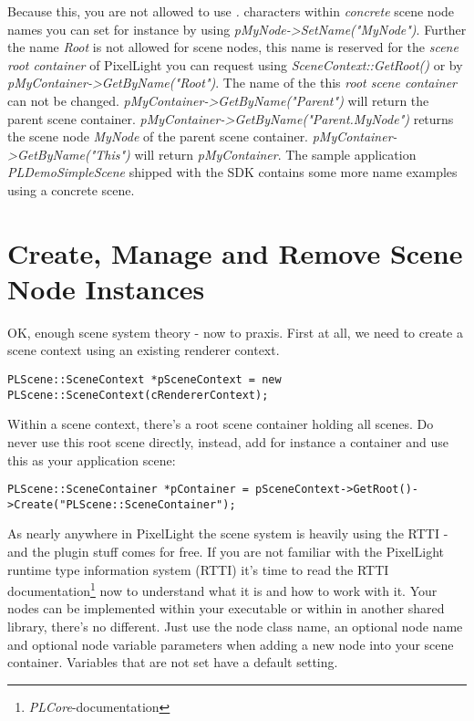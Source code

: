 Because this, you are not allowed to use \emph{.} characters within \emph{concrete} scene node names you can set for instance by using \emph{pMyNode->SetName("MyNode")}. Further the name \emph{Root} is not allowed for scene nodes, this name is reserved for the \emph{scene root container} of PixelLight you can request using \emph{SceneContext::GetRoot()} or by \emph{pMyContainer->GetByName("Root")}. The name of the this \emph{root scene container} can not be changed. \emph{pMyContainer->GetByName("Parent")} will return the parent scene container. \emph{pMyContainer->GetByName("Parent.MyNode")} returns the scene node \emph{MyNode} of the parent scene container. \emph{pMyContainer->GetByName("This")} will return \emph{pMyContainer}. The sample application \emph{PLDemoSimpleScene} shipped with the SDK contains some more name examples using a concrete scene.




\section{Create, Manage and Remove Scene Node Instances}
OK, enough scene system theory - now to praxis. First at all, we need to create a scene context using an existing renderer context.

\begin{lstlisting}[caption=Creating a scene context instance]
PLScene::SceneContext *pSceneContext = new PLScene::SceneContext(cRendererContext);
\end{lstlisting}

Within a scene context, there's a root scene container holding all scenes. Do never use this root scene directly, instead, add for instance a container and use this as your application scene:

\begin{lstlisting}[caption=Creating a new scene container instance]
PLScene::SceneContainer *pContainer = pSceneContext->GetRoot()->Create("PLScene::SceneContainer");
\end{lstlisting}

As nearly anywhere in PixelLight the scene system is heavily using the RTTI - and the plugin stuff comes for free. If you are not familiar with the PixelLight runtime type information system (RTTI) it's time to read the RTTI documentation\footnote{\emph{PLCore}-documentation} now to understand what it is and how to work with it. Your nodes can be implemented within your executable or within in another shared library, there's no different. Just use the node class name, an optional node name and optional node variable parameters when adding a new node into your scene container. Variables that are not set have a default setting.

